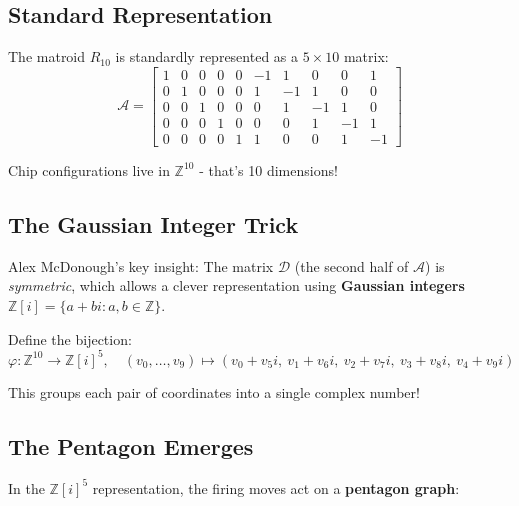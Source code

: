 \documentclass[11pt]{article}
\newcommand{\Z}{\mathbb{Z}}
\begin{document}
\subsection{Standard Representation}

The matroid $R_{10}$ is standardly represented as a $5 \times 10$ matrix:
\[
\mathcal{A} = \begin{bmatrix}
    1 & 0 & 0 & 0 & 0 &   -1 & 1 & 0 & 0 & 1\\
    0 & 1 & 0 & 0 & 0 &   1 & -1 & 1 & 0 & 0\\
    0 & 0 & 1 & 0 & 0 &   0 & 1 & -1 & 1 & 0\\
    0 & 0 & 0 & 1 & 0 &   0 & 0 & 1 & -1 & 1\\
    0 & 0 & 0 & 0 & 1 &   1 & 0 & 0 & 1 & -1
\end{bmatrix}
\]

Chip configurations live in $\Z^{10}$ - that's 10 dimensions!

\subsection{The Gaussian Integer Trick}

Alex McDonough's key insight: The matrix $\mathcal{D}$ (the second half of $\mathcal{A}$) is \emph{symmetric}, which allows a clever representation using \textbf{Gaussian integers} $\Z[i] = \{a + bi : a,b \in \Z\}$.

Define the bijection:
\[
\varphi: \Z^{10} \to \Z[i]^5, \quad (v_0,\ldots,v_9) \mapsto (v_0 + v_5i,~ v_1 + v_6i,~ v_2 + v_7i,~ v_3 + v_8i,~ v_4 + v_9i)
\]

This groups each pair of coordinates into a single complex number!

\subsection{The Pentagon Emerges}

In the $\Z[i]^5$ representation, the firing moves act on a \textbf{pentagon graph}:

\begin{center}
\end{center}
\end{document}
